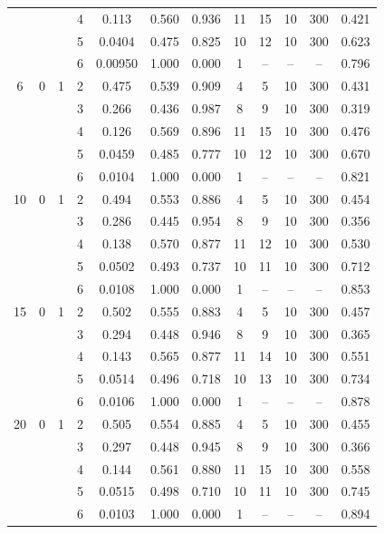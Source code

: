 \documentclass[12pt]{article}
\begin{document}
\begin{table}
\begin{ruledtabular}
\begin{tabular}{cccccccccccc}
 & &  & 4 & 0.113 & 0.560 & 0.936 & 11 & 15 & 10 & 300 & 0.421 \\
 & &  & 5 & 0.0404 & 0.475 & 0.825 & 10 & 12 & 10 & 300 & 0.623 \\
 & &  & 6 & 0.00950 & 1.000 & 0.000 & 1 & -- & -- & -- & 0.796 \\
\hline
6 & 0 & 1 & 2 & 0.475 & 0.539 & 0.909 & 4 & 5 & 10 & 300 & 0.431 \\
 & &  & 3 & 0.266 & 0.436 & 0.987 & 8 & 9 & 10 & 300 & 0.319 \\
 & &  & 4 & 0.126 & 0.569 & 0.896 & 11 & 15 & 10 & 300 & 0.476 \\
 & &  & 5 & 0.0459 & 0.485 & 0.777 & 10 & 12 & 10 & 300 & 0.670 \\
 & &  & 6 & 0.0104 & 1.000 & 0.000 & 1 & -- & -- & -- & 0.821 \\
\hline
10 & 0 & 1 & 2 & 0.494 & 0.553 & 0.886 & 4 & 5 & 10 & 300 & 0.454 \\
 & &  & 3 & 0.286 & 0.445 & 0.954 & 8 & 9 & 10 & 300 & 0.356 \\
 & &  & 4 & 0.138 & 0.570 & 0.877 & 11 & 12 & 10 & 300 & 0.530 \\
 & &  & 5 & 0.0502 & 0.493 & 0.737 & 10 & 11 & 10 & 300 & 0.712 \\
 & &  & 6 & 0.0108 & 1.000 & 0.000 & 1 & -- & -- & -- & 0.853 \\
\hline
15 & 0 & 1 & 2 & 0.502 & 0.555 & 0.883 & 4 & 5 & 10 & 300 & 0.457 \\
 & &  & 3 & 0.294 & 0.448 & 0.946 & 8 & 9 & 10 & 300 & 0.365 \\
 & &  & 4 & 0.143 & 0.565 & 0.877 & 11 & 14 & 10 & 300 & 0.551 \\
 & &  & 5 & 0.0514 & 0.496 & 0.718 & 10 & 13 & 10 & 300 & 0.734 \\
 & &  & 6 & 0.0106 & 1.000 & 0.000 & 1 & -- & -- & -- & 0.878 \\
\hline
20 & 0 & 1 & 2 & 0.505 & 0.554 & 0.885 & 4 & 5 & 10 & 300 & 0.455 \\
 & &  & 3 & 0.297 & 0.448 & 0.945 & 8 & 9 & 10 & 300 & 0.366 \\
 & &  & 4 & 0.144 & 0.561 & 0.880 & 11 & 15 & 10 & 300 & 0.558 \\
 & &  & 5 & 0.0515 & 0.498 & 0.710 & 10 & 11 & 10 & 300 & 0.745 \\
 & &  & 6 & 0.0103 & 1.000 & 0.000 & 1 & -- & -- & -- & 0.894
\end{tabular}
\end{ruledtabular}
\end{table}
\end{document}
